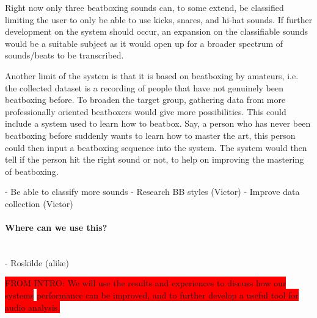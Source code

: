 Right now only three beatboxing sounds can, to some extend, be classified limiting the user to only be able to use kicks, snares, and hi-hat sounds. If further development on the system should occur, an expansion on the classifiable sounds would be a suitable subject as it would open up for a broader spectrum of sounds/beats to be transcribed.

Another limit of the system is that it is based on beatboxing by amateurs, i.e. the collected dataset is a recording of people that have not genuinely been beatboxing before. To broaden the target group, gathering data from more professionally oriented beatboxers would give more possibilities. This could include a system used to learn how to beatbox. Say, a person who has never been beatboxing before suddenly wants to learn how to master the art, this person could then input a beatboxing sequence into the system. The system would then tell if the person hit the right sound or not, to help on improving the mastering of beatboxing.

	- Be able to classify more sounds
		- Research BB styles (Victor)
	- Improve data collection (Victor)


\paragraph{Where can we use this?} \hspace{0pt} \\


	- Roskilde (alike)

\colorbox{red}{FROM INTRO: We will use the results and experiences to discuss how
our systems}
\colorbox{red}{performance can be improved, and to further develop a useful tool for audio
analysis.}



